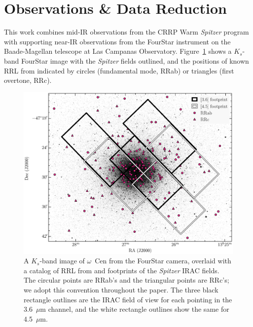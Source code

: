 \documentclass[a4paper,fleqn,usenatbib]{mnras}
\newcommand{\ocen}{$\omega$~Cen\xspace}
\newcommand{\um}{~$\mu$m\xspace}
\begin{document}
\section{Observations \& Data Reduction}
\label{sec:observations}
This work combines mid-IR observations from the CRRP Warm {\it Spitzer} program with supporting near-IR observations from the FourStar instrument \citep{2013PASP..125..654P} on the Baade-Magellan telescope at Las Campanas Observatory. Figure~\ref{fig:omegaCen_fields} shows a $K_s$-band FourStar image with the {\it Spitzer} fields outlined, and the positions of known RRL from \citet{2004A&A...424.1101K} indicated by circles (fundamental mode, RRab) or triangles (first overtone, RRc). 

\begin{figure}
\begin{center}
\includegraphics[width=160mm, trim=1cm 0 1cm 0]{../ocen_only_fitting/final_plots/omegacen_coverage_map_new.eps}
\caption{A $K_s$-band image of \ocen from the FourStar camera, overlaid with a catalog of RRL from \citet{2004A&A...424.1101K} and footprints of the {\it Spitzer} IRAC fields. The circular points are RRab's and the triangular points are RRc's; we adopt this convention throughout the paper. The three black rectangle outlines are the IRAC field of view for each pointing in the 3.6\um channel, and the white rectangle outlines show the same for 4.5\um.
} 
\label{fig:omegaCen_fields}
\end{center}
\end{figure}
\end{document}

